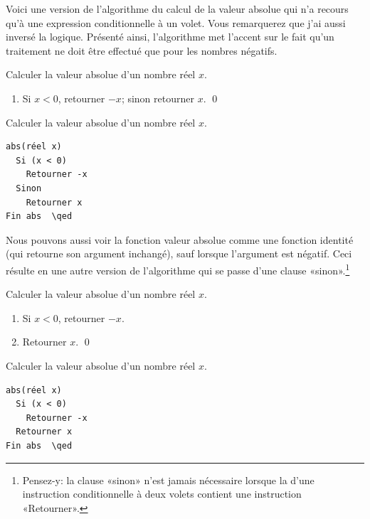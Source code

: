 Voici une version de l'algorithme du calcul de la valeur absolue qui
n'a recours qu'à une expression conditionnelle à un volet. Vous
remarquerez que j'ai aussi inversé la logique. Présenté ainsi,
l'algorithme met l'accent sur le fait qu'un traitement ne doit être
effectué que pour les nombres négatifs.

\begin{multicols}{2}
  \raggedcolumns
  \begin{algorithmebis}
    \label{algo:algorithmes:abs:simplifie}
    Calculer la valeur absolue d'un nombre réel $x$.
    \begin{enumerate}
    \item Si $x < 0$, retourner $-x$; sinon retourner $x$. \qed
    \end{enumerate}
  \end{algorithmebis}
  \columnbreak
  \addtocounter{algorithmebis}{-1}
  \begin{algorithmebis}[Pseudocode]
    Calculer la valeur absolue d'un nombre réel $x$.
    \begin{pseudocode}
\begin{Verbatim}[commandchars=\\\{\}]
abs(réel x)
  Si (x < 0)
    Retourner -x
  Sinon
    Retourner x
Fin abs  \qed
\end{Verbatim}
    \end{pseudocode}
  \end{algorithmebis}
\end{multicols}

Nous pouvons aussi voir la fonction valeur absolue comme une fonction
identité (qui retourne son argument inchangé), sauf lorsque l'argument
est négatif. Ceci résulte en une autre version de l'algorithme qui se
passe d'une clause «sinon».\footnote{%
  Pensez-y: la clause «sinon» n'est jamais nécessaire lorsque la
   d'une instruction conditionnelle à deux volets
  contient une instruction «Retourner».}

\begin{multicols}{2}
  \raggedcolumns
  \begin{algorithmebis}
    \label{algo:algorithmes:abs:simplifie:bis}
    Calculer la valeur absolue d'un nombre réel $x$.
    \begin{enumerate}
    \item Si $x < 0$, retourner $-x$.
    \item Retourner $x$. \qed
    \end{enumerate}
  \end{algorithmebis}
  \columnbreak
  \addtocounter{algorithmebis}{-1}
  \begin{algorithmebis}[Pseudocode]
    Calculer la valeur absolue d'un nombre réel $x$.
    \begin{pseudocode}
\begin{Verbatim}[commandchars=\\\{\}]
abs(réel x)
  Si (x < 0)
    Retourner -x
  Retourner x
Fin abs  \qed
\end{Verbatim}
    \end{pseudocode}
  \end{algorithmebis}
\end{multicols}

